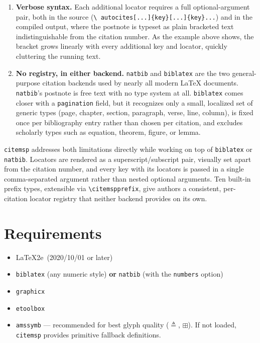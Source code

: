 \documentclass[11pt, a4paper]{article}
\newcommand{\pkg}[1]{\texttt{#1}}
\newcommand{\cmd}[1]{\texttt{\textbackslash #1}}
\begin{document}
\begin{enumerate}[leftmargin=2em]
  \item \textbf{Verbose syntax.} Each additional locator requires a full
    optional-argument pair, both in the source (\texttt{\textbackslash
    autocites[...]\{key\}[...]\{key\}...}) and in the compiled output, where
    the postnote is typeset as plain bracketed text indistinguishable from
    the citation number.  As the example above shows,
    the bracket grows linearly with every additional key and locator,
    quickly cluttering the running text.
\item \textbf{No registry, in either backend.} \pkg{natbib} and \pkg{biblatex}
  are the two general-purpose citation backends used by nearly all modern LaTeX documents. \pkg{natbib}'s postnote is free text
  with no type system at all. \pkg{biblatex} comes closer with a
  \texttt{pagination} field, but it recognizes only a small, localized set
  of generic types (page, chapter, section, paragraph, verse, line, column),
  is fixed once per bibliography entry rather than chosen per citation, and
  excludes scholarly types such as equation, theorem, figure, or lemma.
  \end{enumerate}

\noindent \pkg{citemsp} addresses both limitations directly while working on top of \pkg{biblatex} or
\pkg{natbib}. Locators are
rendered as a superscript/subscript pair, visually set apart from the
citation number, and every key with its locators is passed in a single
comma-separated argument rather than nested optional arguments. Ten
built-in prefix types, extensible via \cmd{citemspprefix}, give authors a
consistent, per-citation locator registry that neither backend provides
on its own.


\section{Requirements}

\begin{itemize}[leftmargin=2em]
  \item \LaTeX2e\ (2020/10/01 or later)
  \item \pkg{biblatex} (any numeric style) \textbf{or} \pkg{natbib}
    (with the \texttt{numbers} option)
  \item \pkg{graphicx}
  \item \pkg{etoolbox}
  \item \pkg{amssymb} --- recommended for best glyph quality
    ($\triangleq$, $\boxplus$).  If not loaded, \pkg{citemsp} provides
    primitive fallback definitions.
\end{itemize}
\end{document}
